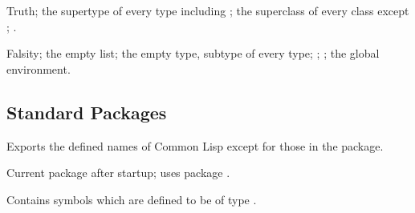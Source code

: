 \begin{LIST}{1cm}
  {
    Truth; the supertype of every type including ; the
    superclass of every class except ; .
  }

  {
    Falsity; the empty list; the empty type, subtype of every type;
    ; ; the global
    environment. 
  }

\end{LIST}


\subsection[Std Packages]{Standard Packages}
\begin{LIST}{1cm}

  {
    Exports the defined names of Common Lisp except for those in the
     package.
  }

  {
    Current package after startup; uses package . 
  }

  {
    Contains symbols which are defined to be of type .
  }

\end{LIST}

